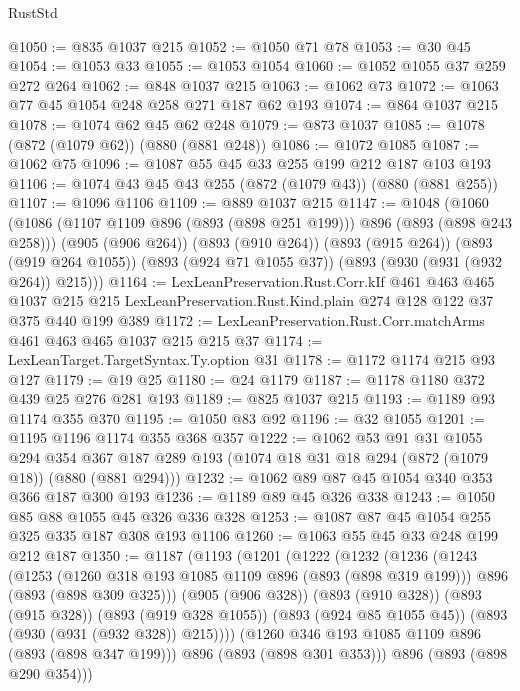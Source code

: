 \begin{lexlean}{RustStd}
\begin{coremodule}
@1050 := @835 @1037 @215
@1052 := @1050 @71 @78
@1053 := @30 @45
@1054 := @1053 @33
@1055 := @1053 @1054
@1060 := @1052 @1055 @37 @259 @272 @264
@1062 := @848 @1037 @215
@1063 := @1062 @73
@1072 := @1063 @77 @45 @1054 @248 @258 @271 @187 @62 @193
@1074 := @864 @1037 @215
@1078 := @1074 @62 @45 @62 @248
@1079 := @873 @1037
@1085 := @1078 (@872 (@1079 @62)) (@880 (@881 @248))
@1086 := @1072 @1085
@1087 := @1062 @75
@1096 := @1087 @55 @45 @33 @255 @199 @212 @187 @103 @193
@1106 := @1074 @43 @45 @43 @255 (@872 (@1079 @43)) (@880 (@881 @255))
@1107 := @1096 @1106
@1109 := @889 @1037 @215
@1147 := @1048
    (@1060
      (@1086 (@1107 @1109 @896 (@893 (@898 @251 @199))) @896 (@893 (@898 @243 @258)))
      (@905 (@906 @264))
      (@893 (@910 @264))
      (@893 (@915 @264))
      (@893 (@919 @264 @1055))
      (@893 (@924 @71 @1055 @37))
      (@893 (@930 (@931 (@932 @264)) @215)))
@1164 := LexLeanPreservation.Rust.Corr.kIf
    @461
    @463
    @465
    @1037
    @215
    @215
    LexLeanPreservation.Rust.Kind.plain
    @274
    @128
    @122
    @37
    @375
    @440
    @199
    @389
@1172 := LexLeanPreservation.Rust.Corr.matchArms @461 @463 @465 @1037 @215 @215 @37
@1174 := LexLeanTarget.TargetSyntax.Ty.option @31
@1178 := @1172 @1174 @215 @93 @127
@1179 := @19 @25
@1180 := @24 @1179
@1187 := @1178 @1180 @372 @439 @25 @276 @281 @193
@1189 := @825 @1037 @215
@1193 := @1189 @93 @1174 @355 @370
@1195 := @1050 @83 @92
@1196 := @32 @1055
@1201 := @1195 @1196 @1174 @355 @368 @357
@1222 := @1062
    @53
    @91
    @31
    @1055
    @294
    @354
    @367
    @187
    @289
    @193
    (@1074 @18 @31 @18 @294 (@872 (@1079 @18)) (@880 (@881 @294)))
@1232 := @1062 @89 @87 @45 @1054 @340 @353 @366 @187 @300 @193
@1236 := @1189 @89 @45 @326 @338
@1243 := @1050 @85 @88 @1055 @45 @326 @336 @328
@1253 := @1087 @87 @45 @1054 @255 @325 @335 @187 @308 @193 @1106
@1260 := @1063 @55 @45 @33 @248 @199 @212 @187
@1350 := @1187
    (@1193
      (@1201
        (@1222
          (@1232
            (@1236
              (@1243
                (@1253
                  (@1260 @318 @193 @1085 @1109 @896 (@893 (@898 @319 @199)))
                  @896
                  (@893 (@898 @309 @325)))
                (@905 (@906 @328))
                (@893 (@910 @328))
                (@893 (@915 @328))
                (@893 (@919 @328 @1055))
                (@893 (@924 @85 @1055 @45))
                (@893 (@930 (@931 (@932 @328)) @215))))
            (@1260 @346 @193 @1085 @1109 @896 (@893 (@898 @347 @199)))
            @896
            (@893 (@898 @301 @353)))
          @896
          (@893 (@898 @290 @354)))

\end{coremodule}
\end{lexlean}
